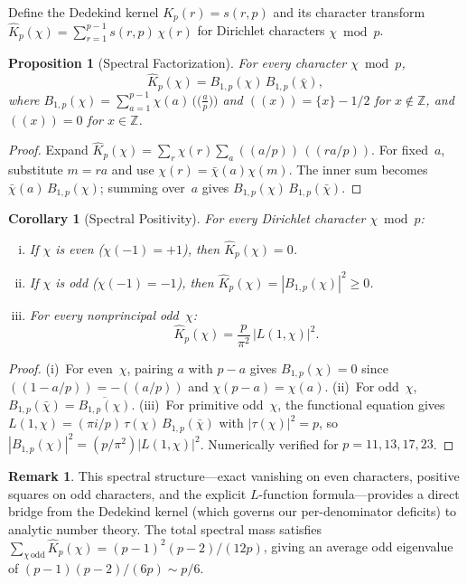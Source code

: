 \documentclass[11pt]{article}
\newtheorem{proposition}[theorem]{Proposition}
\newtheorem{corollary}[theorem]{Corollary}
\theoremstyle{definition}
\newtheorem{remark}[theorem]{Remark}
\newcommand{\Z}{\mathbb{Z}}
\begin{document}
Define the Dedekind kernel $K_p(r) = s(r,p)$ and its
character transform
$\hat{K}_p(\chi) = \sum_{r=1}^{p-1} s(r,p)\,\chi(r)$
for Dirichlet characters $\chi \bmod p$.

\begin{proposition}[Spectral Factorization]
For every character $\chi \bmod p$,
\[
  \hat{K}_p(\chi) = B_{1,p}(\chi)\,B_{1,p}(\bar{\chi}),
\]
where $B_{1,p}(\chi) = \sum_{a=1}^{p-1}\chi(a)\,\bigl(\!\bigl(\tfrac{a}{p}\bigr)\!\bigr)$
and $((x)) = \{x\} - 1/2$ for $x \notin \Z$, and $((x)) = 0$ for $x \in \Z$.
\end{proposition}

\begin{proof}
Expand $\hat{K}_p(\chi) = \sum_r \chi(r) \sum_a ((a/p))\,((ra/p))$.
For fixed~$a$, substitute $m = ra$ and use $\chi(r) = \bar{\chi}(a)\chi(m)$.
The inner sum becomes $\bar{\chi}(a)\,B_{1,p}(\chi)$; summing over~$a$
gives $B_{1,p}(\chi)\,B_{1,p}(\bar{\chi})$.
\end{proof}

\begin{corollary}[Spectral Positivity]\label{cor:spectral-pos}
For every Dirichlet character $\chi \bmod p$:
\begin{enumerate}[(i)]
  \item If $\chi$ is even ($\chi(-1) = +1$), then $\hat{K}_p(\chi) = 0$.
  \item If $\chi$ is odd ($\chi(-1) = -1$), then
    $\hat{K}_p(\chi) = |B_{1,p}(\chi)|^2 \ge 0$.
  \item For every nonprincipal odd~$\chi$:
    \begin{equation}
      \hat{K}_p(\chi) = \frac{p}{\pi^2}\,|L(1,\chi)|^2.
    \end{equation}
\end{enumerate}
\end{corollary}

\begin{proof}
(i)~For even~$\chi$, pairing $a$ with $p-a$ gives $B_{1,p}(\chi) = 0$
since $((1-a/p)) = -((a/p))$ and $\chi(p-a) = \chi(a)$.
(ii)~For odd~$\chi$, $B_{1,p}(\bar\chi) = \overline{B_{1,p}(\chi)}$.
(iii)~For primitive odd~$\chi$, the functional equation gives
$L(1,\chi) = (\pi i/p)\,\tau(\chi)\,B_{1,p}(\bar\chi)$
with $|\tau(\chi)|^2 = p$, so
$|B_{1,p}(\chi)|^2 = (p/\pi^2)|L(1,\chi)|^2$.
Numerically verified for $p = 11, 13, 17, 23$.
\end{proof}

\begin{remark}
This spectral structure---exact vanishing on even characters,
positive squares on odd characters, and the explicit $L$-function
formula---provides a direct bridge from the Dedekind kernel
(which governs our per-denominator deficits) to analytic number
theory.  The total spectral mass satisfies
$\sum_{\chi\,\mathrm{odd}} \hat{K}_p(\chi) = (p-1)^2(p-2)/(12p)$,
giving an average odd eigenvalue of $(p-1)(p-2)/(6p) \sim p/6$.
\end{remark}
\end{document}
